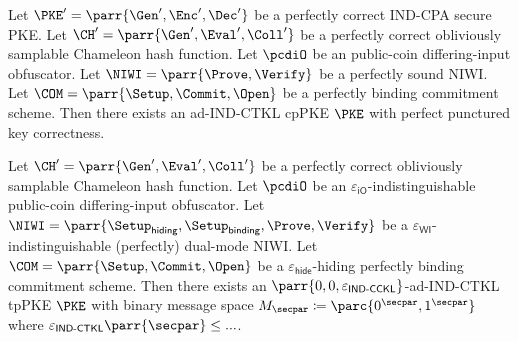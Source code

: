 \begin{theorem}[Informal]
    Let \(\PKE' = \parr{\Gen',\Enc',\Dec'}\) be a perfectly correct IND-CPA secure PKE.
    Let \(\CH' = \parr{\Gen',\Eval',\Coll'}\) be a perfectly correct obliviously samplable Chameleon hash function.
    Let \(\pcdiO\) be an public-coin differing-input obfuscator.
    Let \(\NIWI = \parr{\Prove,\Verify}\) be a perfectly sound NIWI.
    Let \(\COM = \parr{\Setup,\Commit,\Open}\) be a perfectly binding commitment scheme.
    Then there exists an ad-IND-CTKL cpPKE \(\PKE\) with perfect punctured key correctness.
\end{theorem}

\begin{theorem}\label{thm:construction-of-perfect-PK-correctness}
    Let \(\CH' = \parr{\Gen',\Eval',\Coll'}\) be a perfectly correct obliviously samplable Chameleon hash function.
    Let \(\pcdiO\) be an \(\varepsilon_{\textsf{iO}}\)-indistinguishable public-coin differing-input obfuscator.
    Let \(\NIWI = \parr{\Setup_{\textsf{hiding}},\Setup_{\textsf{binding}},\Prove,\Verify}\) be a \(\varepsilon_{\textsf{WI}}\)-indistinguishable (perfectly) dual-mode NIWI.
    Let \(\COM = \parr{\Setup,\Commit,\Open}\) be a \(\varepsilon_{\textsf{hide}}\)-hiding perfectly binding commitment scheme.
    Then there exists an \(\parr{0,0,\varepsilon_{\textsf{IND-CCKL}}}\)-ad-IND-CTKL tpPKE \(\PKE\) with binary message space \(M_\secpar \coloneq \parc{0^\secpar,1^\secpar}\) where \(\varepsilon_{\textsf{IND-CTKL}}\parr{\secpar} \leq ...\).
\end{theorem}

